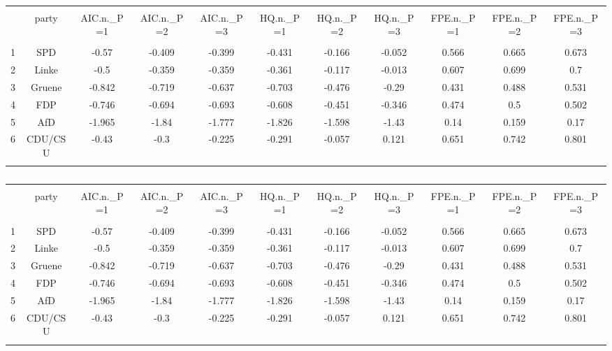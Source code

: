 
\begin{table}[!htbp] \centering 
  \caption{} 
  \label{} 
\begin{tabular}{@{\extracolsep{5pt}} ccccccccccc} 
\\[-1.8ex]\hline 
\hline \\[-1.8ex] 
 & party & AIC.n.\_P=1 & AIC.n.\_P=2 & AIC.n.\_P=3 & HQ.n.\_P=1 & HQ.n.\_P=2 & HQ.n.\_P=3 & FPE.n.\_P=1 & FPE.n.\_P=2 & FPE.n.\_P=3 \\ 
\hline \\[-1.8ex] 
1 & SPD & -0.57 & -0.409 & -0.399 & -0.431 & -0.166 & -0.052 & 0.566 & 0.665 & 0.673 \\ 
2 & Linke & -0.5 & -0.359 & -0.359 & -0.361 & -0.117 & -0.013 & 0.607 & 0.699 & 0.7 \\ 
3 & Gruene & -0.842 & -0.719 & -0.637 & -0.703 & -0.476 & -0.29 & 0.431 & 0.488 & 0.531 \\ 
4 & FDP & -0.746 & -0.694 & -0.693 & -0.608 & -0.451 & -0.346 & 0.474 & 0.5 & 0.502 \\ 
5 & AfD & -1.965 & -1.84 & -1.777 & -1.826 & -1.598 & -1.43 & 0.14 & 0.159 & 0.17 \\ 
6 & CDU/CSU & -0.43 & -0.3 & -0.225 & -0.291 & -0.057 & 0.121 & 0.651 & 0.742 & 0.801 \\ 
\hline \\[-1.8ex] 
\end{tabular} 
\end{table}  

\begin{table}[!htbp] \centering 
  \caption{} 
  \label{} 
\begin{tabular}{@{\extracolsep{5pt}} ccccccccccc} 
\\[-1.8ex]\hline 
\hline \\[-1.8ex] 
 & party & AIC.n.\_P=1 & AIC.n.\_P=2 & AIC.n.\_P=3 & HQ.n.\_P=1 & HQ.n.\_P=2 & HQ.n.\_P=3 & FPE.n.\_P=1 & FPE.n.\_P=2 & FPE.n.\_P=3 \\ 
\hline \\[-1.8ex] 
1 & SPD & -0.57 & -0.409 & -0.399 & -0.431 & -0.166 & -0.052 & 0.566 & 0.665 & 0.673 \\ 
2 & Linke & -0.5 & -0.359 & -0.359 & -0.361 & -0.117 & -0.013 & 0.607 & 0.699 & 0.7 \\ 
3 & Gruene & -0.842 & -0.719 & -0.637 & -0.703 & -0.476 & -0.29 & 0.431 & 0.488 & 0.531 \\ 
4 & FDP & -0.746 & -0.694 & -0.693 & -0.608 & -0.451 & -0.346 & 0.474 & 0.5 & 0.502 \\ 
5 & AfD & -1.965 & -1.84 & -1.777 & -1.826 & -1.598 & -1.43 & 0.14 & 0.159 & 0.17 \\ 
6 & CDU/CSU & -0.43 & -0.3 & -0.225 & -0.291 & -0.057 & 0.121 & 0.651 & 0.742 & 0.801 \\ 
\hline \\[-1.8ex] 
\end{tabular} 
\end{table}  

